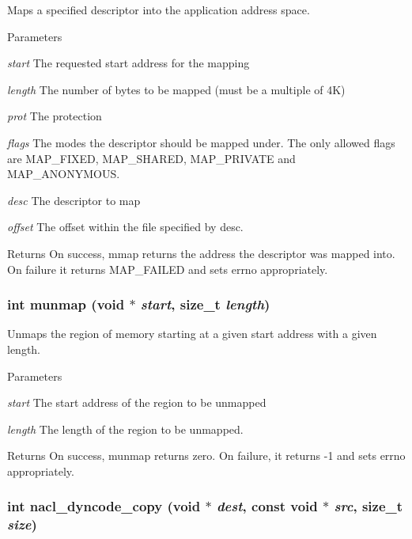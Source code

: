 \label{group__syscalls_ga8937a334d42232a0804ed450bb3b8e27}
Maps a specified descriptor into the application address space. 
\begin{DoxyParams}{Parameters}
\item[{\em start}]The requested start address for the mapping \item[{\em length}]The number of bytes to be mapped (must be a multiple of 4K) \item[{\em prot}]The protection \item[{\em flags}]The modes the descriptor should be mapped under. The only allowed flags are MAP\_\-FIXED, MAP\_\-SHARED, MAP\_\-PRIVATE and MAP\_\-ANONYMOUS. \item[{\em desc}]The descriptor to map \item[{\em offset}]The offset within the file specified by desc. \end{DoxyParams}
\begin{DoxyReturn}{Returns}
On success, mmap returns the address the descriptor was mapped into. On failure it returns MAP\_\-FAILED and sets errno appropriately. 
\end{DoxyReturn}
\hypertarget{group__syscalls_ga559e66a4492a6cb9c6ef5cd07edb8955}{
\subsubsection[{munmap}]{\setlength{\rightskip}{0pt plus 5cm}int munmap (void $\ast$ {\em start}, \/  size\_\-t {\em length})}}
\label{group__syscalls_ga559e66a4492a6cb9c6ef5cd07edb8955}
Unmaps the region of memory starting at a given start address with a given length. 
\begin{DoxyParams}{Parameters}
\item[{\em start}]The start address of the region to be unmapped \item[{\em length}]The length of the region to be unmapped. \end{DoxyParams}
\begin{DoxyReturn}{Returns}
On success, munmap returns zero. On failure, it returns -\/1 and sets errno appropriately. 
\end{DoxyReturn}
\hypertarget{group__syscalls_ga0767bb3577482bd018fad742f12fd35a}{
\subsubsection[{nacl\_\-dyncode\_\-copy}]{\setlength{\rightskip}{0pt plus 5cm}int nacl\_\-dyncode\_\-copy (void $\ast$ {\em dest}, \/  const void $\ast$ {\em src}, \/  size\_\-t {\em size})}}
